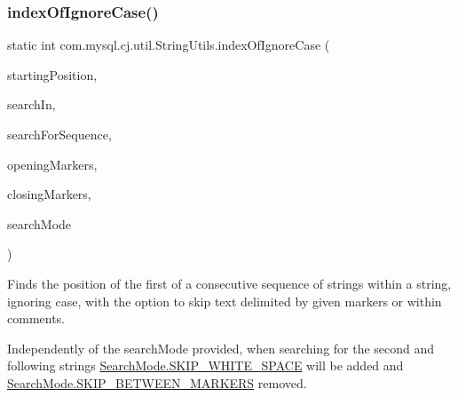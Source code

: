 \subsubsection{\texorpdfstring{index\+Of\+Ignore\+Case()}{indexOfIgnoreCase()}\hspace{0.1cm}{\footnotesize\ttfamily [3/5]}}
{\footnotesize\ttfamily static int com.\+mysql.\+cj.\+util.\+String\+Utils.\+index\+Of\+Ignore\+Case (\begin{DoxyParamCaption}\item[{int}]{starting\+Position,  }\item[{String}]{search\+In,  }\item[{String \mbox{[}$\,$\mbox{]}}]{search\+For\+Sequence,  }\item[{String}]{opening\+Markers,  }\item[{String}]{closing\+Markers,  }\item[{Set$<$ \mbox{\hyperlink{enumcom_1_1mysql_1_1cj_1_1util_1_1_string_utils_1_1_search_mode}{Search\+Mode}} $>$}]{search\+Mode }\end{DoxyParamCaption})\hspace{0.3cm}{\ttfamily [static]}}

Finds the position of the first of a consecutive sequence of strings within a string, ignoring case, with the option to skip text delimited by given markers or within comments. 

Independently of the {\ttfamily search\+Mode} provided, when searching for the second and following strings {\ttfamily \mbox{\hyperlink{enumcom_1_1mysql_1_1cj_1_1util_1_1_string_utils_1_1_search_mode_a241893781068b5a20682538eada16dea}{Search\+Mode.\+S\+K\+I\+P\+\_\+\+W\+H\+I\+T\+E\+\_\+\+S\+P\+A\+CE}}} will be added and {\ttfamily \mbox{\hyperlink{enumcom_1_1mysql_1_1cj_1_1util_1_1_string_utils_1_1_search_mode_afc24d2831de3fa5545c66efba6bf712c}{Search\+Mode.\+S\+K\+I\+P\+\_\+\+B\+E\+T\+W\+E\+E\+N\+\_\+\+M\+A\+R\+K\+E\+RS}}} removed. 


